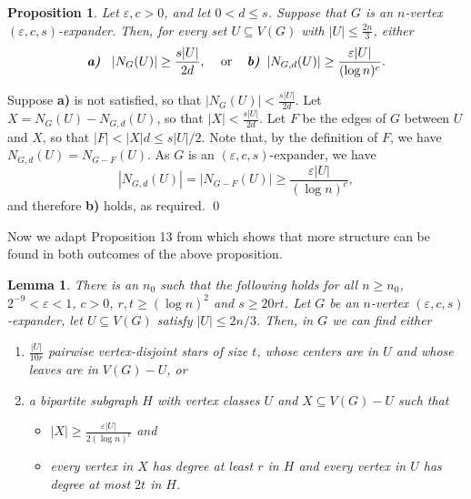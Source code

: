 \documentclass[10pt]{article}
\theoremstyle{plain}
\numberwithin{theorem}{section}
\newtheorem{lemma}[theorem]{Lemma}
\newtheorem{prop}[theorem]{Proposition}
\theoremstyle{definition}
\theoremstyle{remark}
\renewenvironment{proof}[1][]{\begin{trivlist}
\item[\hspace{\labelsep}{\bf\noindent Proof#1.\/}] }{\qed\end{trivlist}}
\renewcommand{\setminus}{-}
\newcommand{\eps}{\varepsilon}
\theoremstyle{plain}
\begin{document}
	\begin{prop}
		\label{prop:strong-expansion}
		Let $\eps, c > 0$, and let $0 < d \le s$. Suppose that $G$ is an $n$-vertex $(\eps, c, s)$-expander. Then, for every set $U \subseteq V(G)$ with $|U| \le \frac{2n}{3}$, either
		\[
			\text{\textbf{\emph{a)}} }\;\;|N_{G}(U)| \ge \frac{s|U|}{2d},\;\;\;\text{ or }\;\;\;\text{\textbf{\emph{b)}}}\;\; |N_{G,d}(U)|\ge \frac{\eps|U|}{(\log n)^{c}}.
		\]
	\end{prop}
	\begin{proof}
		Suppose \textbf{a)} is not satisfied, so that $|N_{G}(U)|<\frac{s|U|}{2d}$. Let $X=N_{G}(U)\setminus N_{G,d}(U)$, so that $|X|<\frac{s|U|}{2d}$. Let $F$ be the edges of $G$ between $U$ and $X$, so that $|F| < |X|d\leq s|U|/2$. Note that, by the definition of $F$, we have $N_{G,d}(U)=N_{G-F}(U)$. As $G$ is an $(\eps, c, s)$-expander, we have
		\[
			|N_{G,d}(U)|=|N_{G-F}(U)|\geq \frac{\eps|U|}{(\log n)^{c}},
		\]
		and therefore \textbf{b)} holds, as required. 
	\end{proof}


	Now we adapt Proposition 13 from \cite{bucic2022erdos} which shows that more structure can be found in both outcomes of the above proposition.

	\begin{lemma} \label{prop:stars}
		There is an $n_0$ such that the following holds for all $n\geq n_0$, $2^{-9} < \eps< 1$, $c > 0$, $r, t \geq (\log n)^2$ and $s\geq 20rt$. Let $G$ be an $n$-vertex $(\eps, c, s)$-expander, let $U \subseteq V (G)$ satisfy $|U| \leq 2n/3$. Then, in $G$ we can find either
		\begin{enumerate}[label=\rm{(\alph*)}]
			\item $\frac{|U|}{10r}$ pairwise vertex-disjoint stars of size $t$, whose centers are in $U$ and whose leaves are in $V(G)\setminus U$, or
			\item \label{propstars:findH} a bipartite subgraph $H$ with vertex classes $U$ and $X\subseteq V(G)\setminus U$ such that
				\begin{itemize}
					\item $|X|\geq \frac{\eps |U|}{2 (\log n)^c}$ and
					\item every vertex in $X$ has degree at least $r$ in $H$ and every vertex in $U$ has degree at most $2t$ in $H$.
				\end{itemize}
		\end{enumerate}
	\end{lemma}
\end{document}
